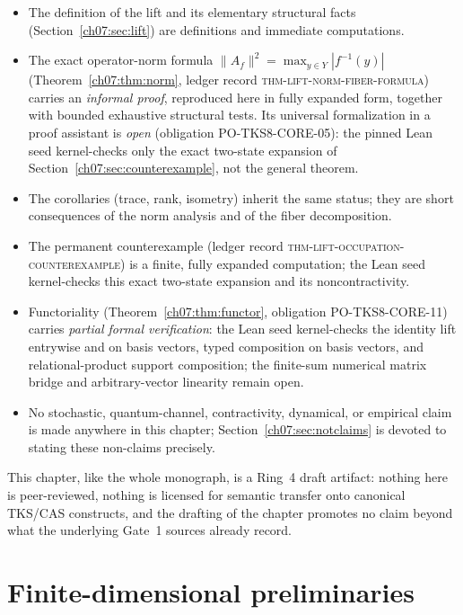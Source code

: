 \begin{itemize}
\item The definition of the lift and its elementary structural facts
  (Section~\ref{ch07:sec:lift}) are definitions and immediate computations.
\item The exact operator-norm formula
  $\lVert A_f\rVert^2=\max_{y\in Y}|f^{-1}(y)|$
  (Theorem~\ref{ch07:thm:norm}, ledger record
  \textsc{thm-lift-norm-fiber-formula}) carries an \emph{informal proof},
  reproduced here in fully expanded form, together with bounded exhaustive
  structural tests. Its universal formalization in a proof assistant is
  \emph{open} (obligation PO-TKS8-CORE-05): the pinned Lean seed kernel-checks
  only the exact two-state expansion of
  Section~\ref{ch07:sec:counterexample}, not the general theorem.
\item The corollaries (trace, rank, isometry) inherit the same status; they
  are short consequences of the norm analysis and of the fiber decomposition.
\item The permanent counterexample (ledger record
  \textsc{thm-lift-occupation-counterexample}) is a finite, fully expanded
  computation; the Lean seed kernel-checks this exact two-state expansion and
  its noncontractivity.
\item Functoriality (Theorem~\ref{ch07:thm:functor}, obligation
  PO-TKS8-CORE-11) carries \emph{partial formal verification}: the Lean seed
  kernel-checks the identity lift entrywise and on basis vectors, typed
  composition on basis vectors, and relational-product support composition;
  the finite-sum numerical matrix bridge and arbitrary-vector linearity
  remain open.
\item No stochastic, quantum-channel, contractivity, dynamical, or empirical
  claim is made anywhere in this chapter; Section~\ref{ch07:sec:notclaims}
  is devoted to stating these non-claims precisely.
\end{itemize}

This chapter, like the whole monograph, is a Ring~4 draft artifact: nothing
here is peer-reviewed, nothing is licensed for semantic transfer onto
canonical TKS/CAS constructs, and the drafting of the chapter promotes no
claim beyond what the underlying Gate~1 sources already record.

\section{Finite-dimensional preliminaries}\label{ch07:sec:prelim}

